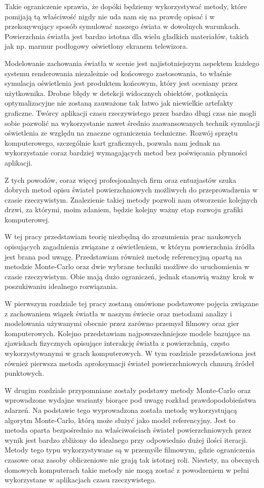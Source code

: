 \documentclass[../main.tex]{subfiles}
\begin{document}
Takie ograniczenie sprawia, że dopóki będziemy wykorzystywać metody, które pomijają tą właściwość nigdy nie uda nam się na prawdę opisać i w przekonywujący sposób symulować naszego świata w dowolnych warunkach. Powierzchnia światła jest bardzo istotna dla wielu gładkich materiałów, takich jak np. marmur podłogowy oświetlony ekranem telewizora.

Modelowanie zachowania światła w scenie jest najistotniejszym aspektem każdego systemu renderowania niezależnie od końcowego zastosowania, to właśnie symulacja oświetlenia jest produktem końcowym, który jest oceniany przez użytkownika. Drobne błędy w detekcji widocznych obiektów, potknięcia optymalizacyjne nie zostaną zauważone tak łatwo jak niewielkie artefakty graficzne. Twórcy aplikacji czasu rzeczywistego przez bardzo długi czas nie mogli sobie pozwolić na wykorzystanie nawet średnio zaawansowanych technik symulacji oświetlenia ze względu na znaczne ograniczenia techniczne. Rozwój sprzętu komputerowego, szczególnie kart graficznych, pozwala nam jednak na wykorzystanie coraz bardziej wymagających metod bez poświęcania płynności aplikacji.

Z tych powodów, coraz więcej profesjonalnych firm oraz entuzjastów szuka dobrych metod opisu świateł powierzchniowych możliwych do przeprowadzenia w czasie rzeczywistym. Znalezienie takiej metody pozwoli nam otworzenie kolejnych drzwi, za którymi, moim zdaniem, będzie kolejny ważny etap rozwoju grafiki komputerowej.

W tej pracy przedstawiam teorię niezbędną do zrozumienia prac naukowych opisujących zagadnienia związane z oświetleniem, w którym powierzchnia źródła jest brana pod uwagę. Przedstawiam również metodę referencyjną opartą na metodzie Monte-Carlo oraz dwie wybrane techniki możliwe do uruchomienia w czasie rzeczywistym. Obie mają dużo ograniczeń, jednak stanowią ważny krok w poszukiwaniu idealnego rozwiązania.

W pierwszym rozdziale tej pracy zostaną omówione podstawowe pojęcia związane z zachowaniem wiązek światła w naszym świecie oraz metodami analizy i modelowania używanymi obecnie przez zarówno przemysł filmowy oraz gier komputerowych. Kolejno przedstawiam najpowszechniejsze modele bazujące na zjawiskach fizycznych opisujące interakcję światła z powierzchnią, często wykorzystywanymi w grach komputerowych. W tym rozdziale przedstawiona jest również pierwsza metoda aproksymacji świateł powierzchniowych chmurą źródeł punktowych.

W drugim rozdziale przypomniane zostały podstawy metody Monte-Carlo oraz wprowadzone wydajne warianty biorące pod uwagę rozkład prawdopodobieństwa zdarzeń. Na podstawie tego wyprowadzona została metodę wykorzystującą algorytm Monte-Carlo, którą może służyć jako model referencyjny. Jest to metoda oparta bezpośrednio na właściwościach świateł powierzchniowych przez wynik jest bardzo zbliżony do idealnego przy odpowiednio dużej ilości iteracji. Metody tego typu wykorzystywane są w przemyśle filmowym, gdzie ograniczenia czasowe oraz zasoby obliczeniowe nie grają tak istotnej roli. Niestety, na obecnych domowych komputerach takie metody nie mogą zostać z powodzeniem w pełni wykorzystane w aplikacjach czasu rzeczywistego.
\end{document}
